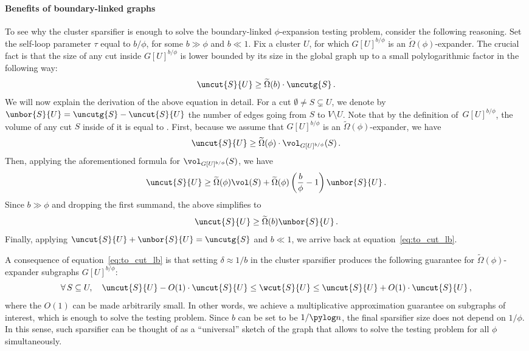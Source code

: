 \paragraph*{Benefits of boundary-linked graphs}
To see why the cluster sparsifier is enough to solve the boundary-linked $\phi$-expansion testing problem, consider the following reasoning. Set the self-loop parameter $\tau$ equal to $b / \phi$, for some $b \gg \phi$ and $b \ll 1$. Fix a cluster $U$, for which $G[U]^{b / \phi}$ is an $\widetilde{\Omega}(\phi)$-expander. 
The crucial fact is that the size of any cut inside $G[U]^{b / \phi}$ is lower bounded by its size in the global graph up to a small polylogarithmic factor in the following way:
\begin{equation}
	\label{eq:to_cut_lb}
	\uncut{S}{U} \geq \widetilde{\Omega}(b) \cdot \uncutg{S} \, .
\end{equation}
We will now explain the derivation of the above equation in detail.
For a cut $\emptyset \neq S \subsetneq U$, we denote by $\unbor{S}{U} = \uncutg{S} - \uncut{S}{U}$ the number of edges going from $S$ to $V \setminus U$. Note that by the definition of~$G[U]^{b / \phi}$, the volume of any cut $S$ inside of it is equal to .
First, because we assume that $G[U]^{b / \phi}$ is an $\widetilde{\Omega}(\phi)$-expander, we have
\begin{equation*}
	\uncut{S}{U} \geq \widetilde{\Omega}(\phi)\cdot \vol_{G[U]^{b / \phi}}(S)\,.
\end{equation*}
Then, applying the aforementioned formula for $\vol_{G[U]^{b / \phi}}(S)$, we have
\begin{equation*}
	\uncut{S}{U} \geq \widetilde{\Omega}(\phi)\vol(S) + \widetilde{\Omega}(\phi)\left(\frac{b}{\phi} -1 \right)\unbor{S}{U} \,.
\end{equation*}
Since $b \gg \phi$ and dropping the first summand, the above simplifies to 
\begin{equation*}
	\uncut{S}{U} \geq  \widetilde{\Omega}(b)\unbor{S}{U} \,.
\end{equation*}
Finally, applying $\uncut{S}{U} + \unbor{S}{U} = \uncutg{S}$ and $b \ll 1$, we arrive back at equation~\eqref{eq:to_cut_lb}.

A consequence of equation~\eqref{eq:to_cut_lb} is that setting $\delta \approx 1/ b$ in the cluster sparsifier produces the following guarantee for $ \widetilde{\Omega}(\phi)$-expander subgraphs $G[U]^{b / \phi}$: 
\begin{equation*}
	\forall \, S \subseteq U, \quad \uncut{S}{U} - O(1) \cdot \uncut{S}{U} \le \wcut{S}{U}  \le \uncut{S}{U} + O(1) \cdot \uncut{S}{U}\,,
\end{equation*}
where the $O(1)$ can be made arbitrarily small. In other words, we achieve a multiplicative approximation guarantee on subgraphs of interest, which is enough to solve the testing problem. Since $b$ can be set to be $1/\pylog n$, the final sparsifier size does not depend on $1/\phi$. In this sense, such sparsifier can be thought of as a ``universal'' sketch of the graph that allows to solve the testing problem for all $\phi$ simultaneously.

